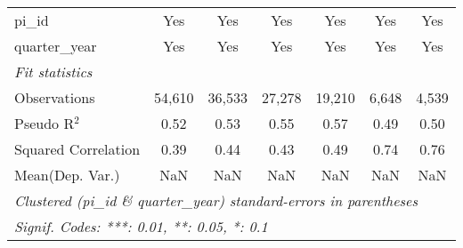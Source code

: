 \begin{tabular}{lcccccc}
   pi\_id                                                     & Yes           & Yes           & Yes           & Yes           & Yes            & Yes\\  
   quarter\_year                                              & Yes           & Yes           & Yes           & Yes           & Yes            & Yes\\  
   \midrule
   \emph{Fit statistics}\\
   Observations                                               & 54,610        & 36,533        & 27,278        & 19,210        & 6,648          & 4,539\\  
   Pseudo R$^2$                                               & 0.52          & 0.53          & 0.55          & 0.57          & 0.49           & 0.50\\  
   Squared Correlation                                        & 0.39          & 0.44          & 0.43          & 0.49          & 0.74           & 0.76\\  
Mean(Dep. Var.) & NaN & NaN & NaN & NaN & NaN & NaN \\
   \midrule \midrule
   \multicolumn{7}{l}{\emph{Clustered (pi\_id \& quarter\_year) standard-errors in parentheses}}\\
   \multicolumn{7}{l}{\emph{Signif. Codes: ***: 0.01, **: 0.05, *: 0.1}}\\
\end{tabular}
\par\endgroup

